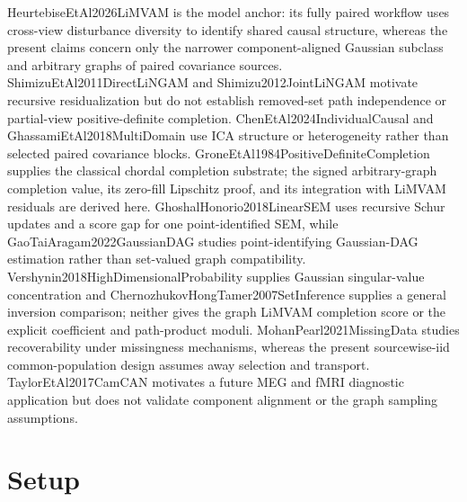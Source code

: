 \documentclass{article}
\begin{document}
HeurtebiseEtAl2026LiMVAM is the model anchor: its fully paired workflow uses cross-view disturbance diversity to identify shared causal structure, whereas the present claims concern only the narrower component-aligned Gaussian subclass and arbitrary graphs of paired covariance sources. ShimizuEtAl2011DirectLiNGAM and Shimizu2012JointLiNGAM motivate recursive residualization but do not establish removed-set path independence or partial-view positive-definite completion. ChenEtAl2024IndividualCausal and GhassamiEtAl2018MultiDomain use ICA structure or heterogeneity rather than selected paired covariance blocks. GroneEtAl1984PositiveDefiniteCompletion supplies the classical chordal completion substrate; the signed arbitrary-graph completion value, its zero-fill Lipschitz proof, and its integration with LiMVAM residuals are derived here. GhoshalHonorio2018LinearSEM uses recursive Schur updates and a score gap for one point-identified SEM, while GaoTaiAragam2022GaussianDAG studies point-identifying Gaussian-DAG estimation rather than set-valued graph compatibility. Vershynin2018HighDimensionalProbability supplies Gaussian singular-value concentration and ChernozhukovHongTamer2007SetInference supplies a general inversion comparison; neither gives the graph LiMVAM completion score or the explicit coefficient and path-product moduli. MohanPearl2021MissingData studies recoverability under missingness mechanisms, whereas the present sourcewise-iid common-population design assumes away selection and transport. TaylorEtAl2017CamCAN motivates a future MEG and fMRI diagnostic application but does not validate component alignment or the graph sampling assumptions.

\section{Setup}
\end{document}
